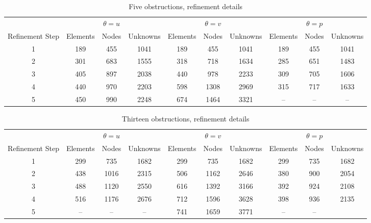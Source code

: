 \documentclass[wrr]{agutex}  %
\begin{document}
\begin{article}
\begin{table}
\flushleft
\caption{Five obstructions, refinement details}\label{tbl:5holes}
\begin{tabular}{cccccccccc}
\toprule
&& $\theta=u$& &&$\theta=v$& & &$\theta=p$&\\   
Refinement Step & Elements & Nodes & Unknowns & Elements & Nodes & Unknowns & Elements & Nodes & Unknowns\\
\midrule
1 & 189 & 455 & 1041 & 189 & 455 & 1041 & 189 & 455 & 1041 \\
2 & 301 & 683 & 1555 & 318 & 718 & 1634 & 285 & 651 & 1483 \\
3 & 405 & 897 & 2038 & 440 & 978 & 2233 & 309 & 705 & 1606 \\
4 & 440 & 970 & 2203 & 598 & 1308 & 2969 & 315 & 717 & 1633 \\
5 & 450 & 990 & 2248 & 674 & 1464 & 3321 & -- & -- & --\\
\bottomrule
\end{tabular}
\end{table}

\begin{table}
\flushleft
\caption{Thirteen obstructions, refinement details}\label{tbl:13holes}
\begin{tabular}{cccccccccc}
\toprule
&& $\theta=u$& &&$\theta=v$& & &$\theta=p$&\\   
Refinement Step & Elements & Nodes & Unknowns & Elements & Nodes & Unknowns & Elements & Nodes & Unknowns\\
\midrule
1 & 299 & 735 & 1682 & 299 & 735 & 1682 & 299 & 735 & 1682 \\
2 & 438 & 1016 & 2315 & 506 & 1162 & 2646 & 380 & 900 & 2054 \\
3 & 488 & 1120 & 2550 & 616 & 1392 & 3166 & 392 & 924 & 2108 \\
4 & 516 & 1176 & 2676 & 712 & 1596 & 3628 & 398 & 936 & 2135 \\
5 & -- & -- & -- & 741 & 1659 & 3771 & -- & -- &  \\
\bottomrule
\end{tabular}
\end{table}






\end{article}
\end{document}
